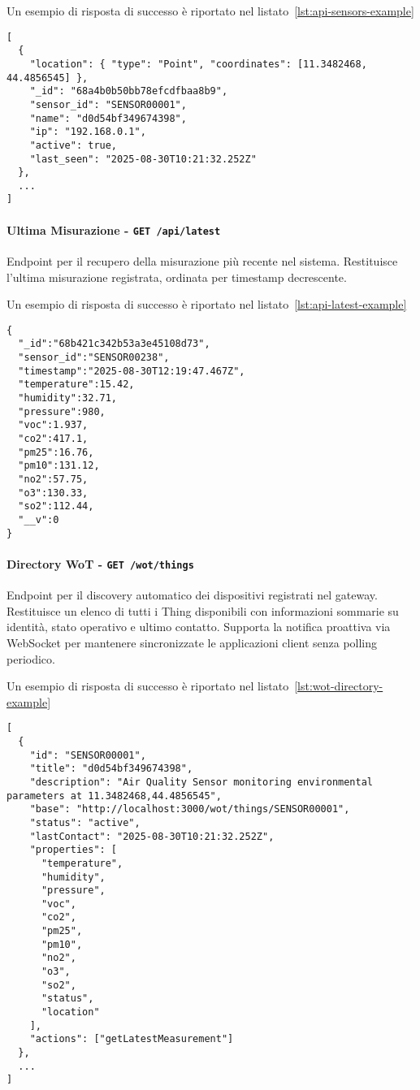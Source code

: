 Un esempio di risposta di successo è riportato nel listato~\ref{lst:api-sensors-example}
\begin{lstlisting}[caption={Risposta di sucesso per endpoint \texttt{sensors}},label=lst:api-sensors-example]
[
  {
    "location": { "type": "Point", "coordinates": [11.3482468, 44.4856545] },
    "_id": "68a4b0b50bb78efcdfbaa8b9",
    "sensor_id": "SENSOR00001",
    "name": "d0d54bf349674398",
    "ip": "192.168.0.1",
    "active": true,
    "last_seen": "2025-08-30T10:21:32.252Z"
  },
  ...
]
\end{lstlisting}

\paragraph{Ultima Misurazione - \texttt{GET /api/latest}}

Endpoint per il recupero della misurazione più recente nel sistema.
Restituisce l'ultima misurazione registrata, ordinata per timestamp decrescente.

Un esempio di risposta di successo è riportato nel listato~\ref{lst:api-latest-example}
\begin{lstlisting}[caption={Risposta di sucesso per endpoint \texttt{latest}},label=lst:api-latest-example]
{
  "_id":"68b421c342b53a3e45108d73",
  "sensor_id":"SENSOR00238",
  "timestamp":"2025-08-30T12:19:47.467Z",
  "temperature":15.42,
  "humidity":32.71,
  "pressure":980,
  "voc":1.937,
  "co2":417.1,
  "pm25":16.76,
  "pm10":131.12,
  "no2":57.75,
  "o3":130.33,
  "so2":112.44,
  "__v":0
}
\end{lstlisting}

\paragraph{Directory WoT - \texttt{GET /wot/things}}

Endpoint per il discovery automatico dei dispositivi registrati nel gateway.
Restituisce un elenco di tutti i Thing disponibili con informazioni sommarie su identità,
stato operativo e ultimo contatto. Supporta la notifica proattiva via WebSocket per mantenere sincronizzate
le applicazioni client senza polling periodico.

Un esempio di risposta di successo è riportato nel listato~\ref{lst:wot-directory-example}
\begin{lstlisting}[caption={Risposta di successo per endpoint \texttt{/wot/things}}, label=lst:wot-directory-example]
[
  {
    "id": "SENSOR00001",
    "title": "d0d54bf349674398",
    "description": "Air Quality Sensor monitoring environmental parameters at 11.3482468,44.4856545",
    "base": "http://localhost:3000/wot/things/SENSOR00001",
    "status": "active",
    "lastContact": "2025-08-30T10:21:32.252Z",
    "properties": [
      "temperature",
      "humidity",
      "pressure",
      "voc",
      "co2",
      "pm25",
      "pm10",
      "no2",
      "o3",
      "so2",
      "status",
      "location"
    ],
    "actions": ["getLatestMeasurement"]
  },
  ...
]
\end{lstlisting}

